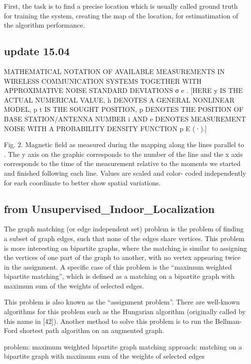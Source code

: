 \documentclass[conference]{IEEEtran}
\begin{document}
First, the task is to find a precise location which is usually called ground truth for training the system, creating the map of the location, for estimatimation of the algorithm performance.



\subsection{update 15.04}

MATHEMATICAL NOTATION OF AVAILABLE MEASUREMENTS IN WIRELESS COMMUNICATION SYSTEMS TOGETHER WITH APPROXIMATIVE NOISE STANDARD DEVIATIONS σ e . [HERE y IS THE ACTUAL NUMERICAL VALUE, h DENOTES A GENERAL NONLINEAR MODEL, p t IS THE SOUGHT POSITION, p DENOTES THE POSITION OF BASE STATION/ANTENNA NUMBER i AND e DENOTES MEASUREMENT NOISE WITH A PROBABILITY DENSITY FUNCTION p E (·).]

Fig. 2. Magnetic field as measured during the mapping along the lines parallel to . The y axis on the graphic corresponds to the number of the line and the x axis corresponds to the time of the measurement relative to the moments we started and finished following each line. Values are scaled and color- coded independently for each coordinate to better show spatial variations.

\subsection{from Unsupervised_Indoor_Localization}

The graph matching (or edge independent set) problem is the problem of finding a subset of graph edges, such that none of the edges share vertices. This problem is more interesting on bipartite graphs, where the matching is similar to assigning the vertices of one part of the graph to another, with no vertex appearing twice in the assignment. A specific case of this problem is the “maximum weighted bipartite matching”, which is defined as a matching on a bipartite graph with maximum sum of the weights of selected edges.

This problem is also known as the “assignment problem”. There are well-known algorithms for this problem such as the Hungarian algorithm (originally called by this name in [42]). Another method to solve this problem is to run the Bellman-Ford shortest path algorithm on an augmented graph.

problem: maximum weighted bipartite graph matching
approach: matching on a bipartite graph with maximum sum of the weights of selected edges
\end{document}
